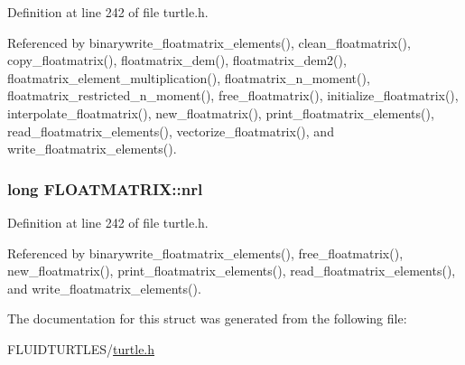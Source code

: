 Definition at line 242 of file turtle.\-h.



Referenced by binarywrite\-\_\-floatmatrix\-\_\-elements(), clean\-\_\-floatmatrix(), copy\-\_\-floatmatrix(), floatmatrix\-\_\-dem(), floatmatrix\-\_\-dem2(), floatmatrix\-\_\-element\-\_\-multiplication(), floatmatrix\-\_\-n\-\_\-moment(), floatmatrix\-\_\-restricted\-\_\-n\-\_\-moment(), free\-\_\-floatmatrix(), initialize\-\_\-floatmatrix(), interpolate\-\_\-floatmatrix(), new\-\_\-floatmatrix(), print\-\_\-floatmatrix\-\_\-elements(), read\-\_\-floatmatrix\-\_\-elements(), vectorize\-\_\-floatmatrix(), and write\-\_\-floatmatrix\-\_\-elements().

\hypertarget{struct_f_l_o_a_t_m_a_t_r_i_x_af584286f711f52f38aeddb934fe43df3}{
\subsubsection[{nrl}]{\setlength{\rightskip}{0pt plus 5cm}long F\-L\-O\-A\-T\-M\-A\-T\-R\-I\-X\-::nrl}}\label{struct_f_l_o_a_t_m_a_t_r_i_x_af584286f711f52f38aeddb934fe43df3}


Definition at line 242 of file turtle.\-h.



Referenced by binarywrite\-\_\-floatmatrix\-\_\-elements(), free\-\_\-floatmatrix(), new\-\_\-floatmatrix(), print\-\_\-floatmatrix\-\_\-elements(), read\-\_\-floatmatrix\-\_\-elements(), and write\-\_\-floatmatrix\-\_\-elements().



The documentation for this struct was generated from the following file\-:\begin{DoxyCompactItemize}
\item 
F\-L\-U\-I\-D\-T\-U\-R\-T\-L\-E\-S/\hyperlink{turtle_8h}{turtle.\-h}\end{DoxyCompactItemize}
